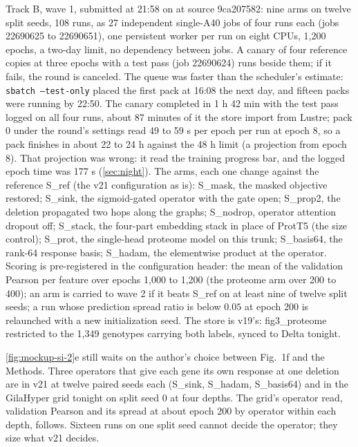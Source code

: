  Track B, wave 1, submitted at 21:58 on
 at source 9ca207582: nine arms on twelve split seeds, 108 runs, as 27
independent single-A40 jobs of four runs each (jobs 22690625 to 22690651), one persistent
worker per run on eight CPUs, 1{,}200 epochs, a two-day limit, no dependency between jobs.
A canary of four reference copies at three epochs with a test pass (job 22690624) runs
beside them; if it fails, the round is canceled. The queue was faster than the scheduler's
estimate: \texttt{sbatch --test-only} placed the first pack at 16:08 the next day, and
fifteen packs were running by 22:50. The canary completed in 1 h 42 min with the test pass
logged on all four runs, about 87 minutes of it the store import from Lustre; pack 0 under
the round's settings read 49 to 59 s per epoch per run at epoch 8, so a pack finishes in
about 22 to 24 h against the 48 h limit (a projection from epoch 8). That projection was wrong: it read the
training progress bar, and the logged epoch time was 177 s (\cref{sec:night}). The arms, each one
change against the reference S\_ref (the v21 configuration as
is): S\_mask, the masked objective restored; S\_sink, the sigmoid-gated operator with the
gate open; S\_prop2, the deletion propagated two hops along the graphs; S\_nodrop, operator
attention dropout off; S\_stack, the four-part embedding stack in place of ProtT5 (the size
control); S\_prot, the single-head proteome model on this trunk; S\_basis64, the rank-64
response basis; S\_hadam, the elementwise product at the operator. Scoring is
pre-registered in the configuration header: the mean of the validation Pearson per feature
over epochs 1{,}000 to 1{,}200 (the proteome arm over 200 to 400); an arm is carried to wave
2 if it beats S\_ref on at least nine of twelve split seeds; a run whose prediction spread
ratio is below $0.05$ at epoch 200 is relaunched with a new initialization seed. The store
is v19's: fig3\_proteome restricted to the 1{,}349 genotypes carrying both labels, synced to
Delta tonight.

 \cref{fig:mockup-si-2}e
still waits on the author's choice between Fig.~1f and the Methods. Three operators that
give each gene its own response at one deletion are in v21 at twelve paired seeds each
(S\_sink, S\_hadam, S\_basis64) and in the GilaHyper grid tonight on split seed 0 at four
depths. The grid's operator read, validation Pearson and its spread at about epoch 200 by
operator within each depth, follows. Sixteen runs on one split seed cannot decide the
operator; they size what v21 decides.

